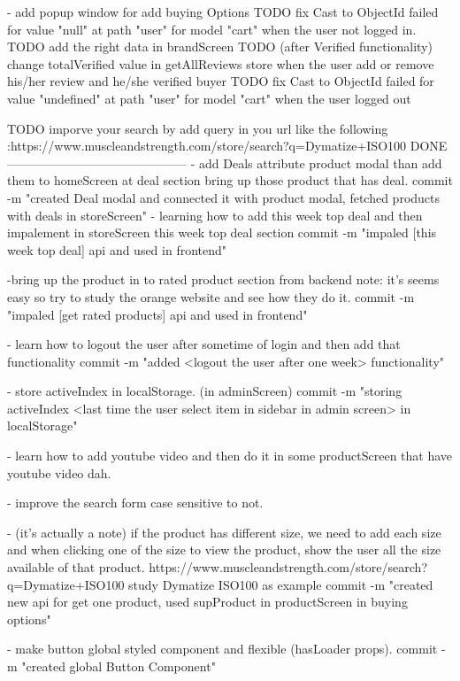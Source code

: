 -   add popup window for add buying Options
TODO   fix Cast to ObjectId failed for value "null" at path "user" for model "cart" when the user not logged in.
TODO   add the right data in brandScreen 
TODO   (after Verified functionality) change totalVerified value in getAllReviews store when the user add or remove his/her review and he/she verified buyer
TODO fix Cast to ObjectId failed for value "undefined" at path 
      "user" for model "cart" when the user logged out

TODO imporve your search by add query in you url like the following :https://www.muscleandstrength.com/store/search?q=Dymatize+ISO100
DONE
--------------------------------------------
- add Deals attribute product modal than add them to homeScreen 
       at deal section bring up those product that has deal.
       commit -m "created Deal modal and connected it with product modal, fetched products with deals in 
       storeScreen"
- learning how to add this week top deal and then impalement in storeScreen this week top deal section
      commit -m "impaled [this week top deal] api and used in frontend"

-bring up the product in to rated product section from backend 
      note: it's seems easy so try to study the orange website and see how they do it.
      commit -m "impaled [get rated products] api and used in frontend"

-   learn how to logout the user after sometime of login and 
            then add that functionality
      commit -m "added <logout the user after one week> functionality"

- store activeIndex in localStorage. (in adminScreen)
      commit -m "storing activeIndex <last time the user select item in sidebar in admin screen> in localStorage"

- learn how to add youtube video and then do it in some 
      productScreen that have youtube video dah.

- improve the search form case sensitive to not.

-  (it's actually a note) if the product has different size, 
      we need to add each size and when
      clicking one of the size to view the product, show the 
      user all the size available of that product.
      https://www.muscleandstrength.com/store/search?q=Dymatize+ISO100
      study Dymatize ISO100 as example
      commit -m "created new api for get one product, used supProduct in productScreen in buying options"

-   make button global styled component and flexible 
      (hasLoader props).
      commit -m "created global Button Component"

